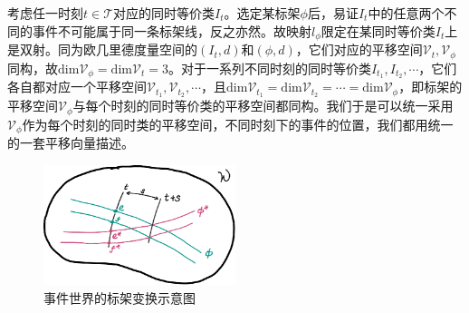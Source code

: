 \documentclass[main.tex]{subfiles}
\begin{document}
考虑任一时刻$t\in\mathcal{T}$对应的同时等价类$I_t$。选定某标架$\phi$后，易证$I_t$中的任意两个不同的事件不可能属于同一条标架线，反之亦然。故映射$l_\phi$限定在某同时等价类$I_t$上是双射。同为欧几里德度量空间的$\left(I_t,d\right)$和$\left(\phi,d\right)$，它们对应的平移空间$\mathcal{V}_t,\mathcal{V}_\phi$同构，故$\mathrm{dim}\mathcal{V}_\phi=\mathrm{dim}\mathcal{V}_t=3$。对于一系列不同时刻的同时等价类$I_{t_1},I_{t_2},\cdots$，它们各自都对应一个平移空间$\mathcal{V}_{t_1},\mathcal{V}_{t_2},\cdots$，且$\mathrm{dim}\mathcal{V}_{t_1}=\mathrm{dim}\mathcal{V}_{t_2}=\cdots=\mathrm{dim}\mathcal{V}_\phi$，即标架的平移空间$\mathcal{V}_\phi$与每个时刻的同时等价类的平移空间都同构。我们于是可以统一采用$\mathcal{V}_\phi$作为每个时刻的同时类的平移空间，不同时刻下的事件的位置，我们都用统一的一套平移向量描述。

\begin{figure}[h]
\centering
\includegraphics[width=0.5\textwidth]{images/III.1.4.eps}
\caption{事件世界的标架变换示意图}
\label{fig:III.1.4}
\end{figure}
\end{document}
